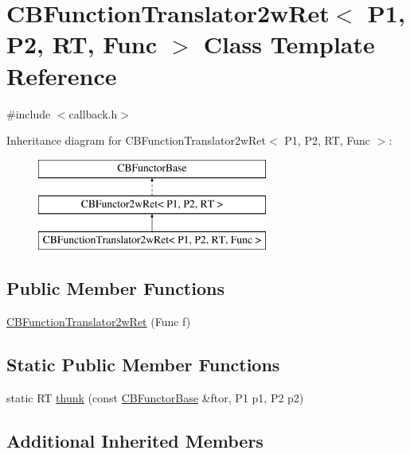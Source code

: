 \hypertarget{class_c_b_function_translator2w_ret}{\section{C\+B\+Function\+Translator2w\+Ret$<$ P1, P2, R\+T, Func $>$ Class Template Reference}
\label{class_c_b_function_translator2w_ret}
}


{\ttfamily \#include $<$callback.\+h$>$}

Inheritance diagram for C\+B\+Function\+Translator2w\+Ret$<$ P1, P2, R\+T, Func $>$\+:\begin{figure}[H]
\begin{center}
\leavevmode
\includegraphics[height=3.000000cm]{class_c_b_function_translator2w_ret}
\end{center}
\end{figure}
\subsection*{Public Member Functions}
\begin{DoxyCompactItemize}
\item 
\hyperlink{class_c_b_function_translator2w_ret_ae3bc8f17074bb2229c7fcdff0ac43cd2}{C\+B\+Function\+Translator2w\+Ret} (Func f)
\end{DoxyCompactItemize}
\subsection*{Static Public Member Functions}
\begin{DoxyCompactItemize}
\item 
static R\+T \hyperlink{class_c_b_function_translator2w_ret_adcb4d97648e50b15dd26f03646d20374}{thunk} (const \hyperlink{class_c_b_functor_base}{C\+B\+Functor\+Base} \&ftor, P1 p1, P2 p2)
\end{DoxyCompactItemize}
\subsection*{Additional Inherited Members}


